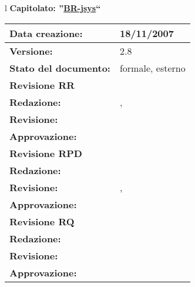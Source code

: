 

\newcommand{\lv}{2.8} %
\newcommand{\dt}{ Analisi Dei Requisiti }%


\begin{center}
\thispagestyle{plain}
\begin{table}[htbp]
\large{
\begin{tabular}{l}
\Large{\textbf{\textsf{Capitolato: ''\underline{BR-jsys}``}}} \\
\begin{tabular}{|p{6cm}|p{6cm}|} \hline
\textbf{Data creazione:} & 18/11/2007 \\ \hline
\textbf{Versione:} & \lv \\ \hline
\textbf{Stato del documento:} & formale, esterno \\ \hline
\textbf{Revisione RR} &   \\ \hline
\textbf{Redazione:} & \MB, \AT \\ \hline
\textbf{Revisione:} &   \MT \\ \hline
\textbf{Approvazione:}  & \ET \\ \hline
\textbf{Revisione RPD} &  \\ \hline 
\textbf{Redazione:} & \MT \\ \hline
\textbf{Revisione:} &  \AT, \MB \\ \hline
\textbf{Approvazione:}  & \ET \\ \hline
\textbf{Revisione RQ} &   \\ \hline
\textbf{Redazione:} & \ET \\ \hline
\textbf{Revisione:} & \MM \\ \hline
\textbf{Approvazione:}  & \MT \\ \hline

\end{tabular} \\
\end{tabular}
}
\end{table}


\end{center}
